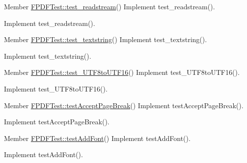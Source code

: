 \label{todo__todo000209}
\hypertarget{todo__todo000209}{}
 
\begin{DoxyDescription}
\item[Member \hyperlink{class_f_p_d_f_test_afa1f3115925eb2bbe21999229e436ea4}{FPDFTest::test\_\-readstream}() ]Implement test\_\-readstream().

Implement test\_\-readstream().
\end{DoxyDescription}

\label{todo__todo000204}
\hypertarget{todo__todo000204}{}
 
\begin{DoxyDescription}
\item[Member \hyperlink{class_f_p_d_f_test_a26334b369d05385e241f4a661a2ed72f}{FPDFTest::test\_\-textstring}() ]Implement test\_\-textstring().

Implement test\_\-textstring().
\end{DoxyDescription}

\label{todo__todo000205}
\hypertarget{todo__todo000205}{}
 
\begin{DoxyDescription}
\item[Member \hyperlink{class_f_p_d_f_test_aaf523c46d6eed2b648c2f70ff27d34bf}{FPDFTest::test\_\-UTF8toUTF16}() ]Implement test\_\-UTF8toUTF16().

Implement test\_\-UTF8toUTF16().
\end{DoxyDescription}

\label{todo__todo000186}
\hypertarget{todo__todo000186}{}
 
\begin{DoxyDescription}
\item[Member \hyperlink{class_f_p_d_f_test_aacd187932d4ba95945d7368040b0b0f9}{FPDFTest::testAcceptPageBreak}() ]Implement testAcceptPageBreak().

Implement testAcceptPageBreak().
\end{DoxyDescription}

\label{todo__todo000179}
\hypertarget{todo__todo000179}{}
 
\begin{DoxyDescription}
\item[Member \hyperlink{class_f_p_d_f_test_aa7c6ae9047be47e7b38c0fbf52dd8619}{FPDFTest::testAddFont}() ]Implement testAddFont().

Implement testAddFont().
\end{DoxyDescription}

